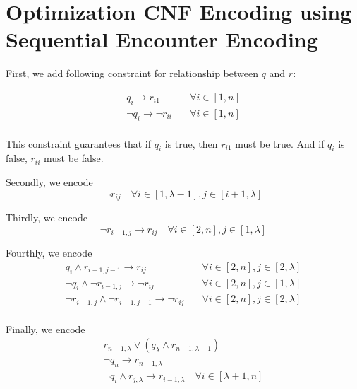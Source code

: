 \section{Optimization CNF Encoding using Sequential Encounter Encoding}

First, we add following constraint for relationship between $q$ and $r$:

\begin{equation}
    \label{eq:7}
    \begin{aligned}
        q_i \rightarrow r_{i1}           & \quad \forall i \in [1, n] \\
        \neg q_i \rightarrow \neg r_{ii} & \quad \forall i \in [1, n] \\
    \end{aligned}
\end{equation}

This constraint guarantees that if $q_i$ is true, then $r_{i1}$ must be true.
And if $q_i$ is false, $r_{ii}$ must be false.

Secondly, we encode
\begin{equation}
    \label{eq:8}
    \neg r_{ij} \quad \forall i \in [1, \lambda - 1], j \in [i + 1, \lambda]
\end{equation}

Thirdly, we encode
\begin{equation}
    \label{eq:9}
    \neg r_{i-1,j} \rightarrow r_{ij} \quad \forall i \in [2, n], j \in [1, \lambda]
\end{equation}

Fourthly, we encode
\begin{equation}
    \label{eq:10}
    \begin{aligned}
        q_{i} \wedge r_{i-1,j-1} \rightarrow r_{ij}                    & \quad \forall i \in [2, n], j \in [2, \lambda] \\
        \neg q_{i} \wedge \neg r_{i-1,j} \rightarrow \neg r_{ij}       & \quad \forall i \in [2, n], j \in [1, \lambda] \\
        \neg r_{i-1,j} \wedge \neg r_{i-1,j-1} \rightarrow \neg r_{ij} & \quad \forall i \in [2, n], j \in [2, \lambda] \\
    \end{aligned}
\end{equation}

Finally, we encode
\begin{equation}
    \label{eq:11}
    \begin{gathered}
        r_{n-1,\lambda} \vee (q_{\lambda} \wedge r_{n-1,\lambda-1})                                    \\
        \neg q_n \rightarrow r_{n-1,\lambda}                                                           \\
        \neg q_i \wedge r_{j,\lambda} \rightarrow r_{i-1,\lambda} \quad \forall i \in [\lambda + 1, n] \\
    \end{gathered}
\end{equation}